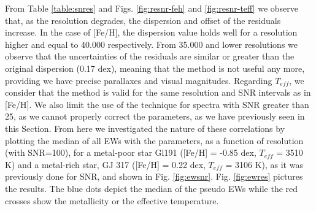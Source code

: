 \documentclass{aa}
\begin{document}
From Table \ref{table:snres} and Figs. \ref{fig:resnr-feh} and \ref{fig:resnr-teff} we observe that, as the resolution degrades, the dispersion and offset of the residuals increase. In the case of [Fe/H], the dispersion value holds well for a resolution higher and equal to 40.000 respectively. From 35.000 and lower resolutions we observe that the uncertainties of the residuals are similar or greater than the original dispersion (0.17 dex), meaning that the method is not useful any more, providing we have precise parallaxes and visual magnitudes. %
Regarding $T_{eff}$, we consider that the method is valid for the same resolution and SNR intervals as in [Fe/H]. We also limit the use of the technique for spectra with SNR greater than 25, as we cannot properly correct the parameters, as we have previously seen in this Section. %
From here we investigated the nature of these correlations by plotting the median of all EWs with the parameters, as a function of resolution (with SNR=100), for a metal-poor star Gl191 ([Fe/H] = -0.85 dex, $T_{eff}$ = 3510 K) and a metal-rich star, GJ 317 ([Fe/H] = 0.22 dex, $T_{eff}$ = 3106 K), as it was previously done for SNR, and shown in Fig. \ref{fig:ewsnr}. Fig. \ref{fig:ewres} pictures the results. The blue dots depict the median of the pseudo EWs while the red crosses show the metallicity or the effective temperature.
\end{document}

